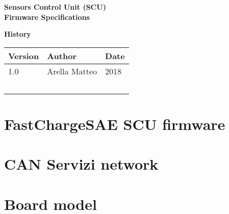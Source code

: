 \documentclass[twoside]{book}
\newcommand{\+}{\discretionary{\mbox{\scriptsize$\hookleftarrow$}}{}{}}
\newcommand{\clearemptydoublepage}{%
  \newpage{\pagestyle{empty}\cleardoublepage}%
}
\begin{document}
\hypersetup{pageanchor=false,
             bookmarksnumbered=true,
             pdfencoding=unicode
            }
\begin{titlepage}
\vspace*{7cm}
\begin{center}%
{\Large \textbf{Sensors Control Unit (SCU) }}\\
\vspace*{1cm}
{\large \textbf{Firmware Specifications}}\\
\end{center}
\end{titlepage}
\clearemptydoublepage
{}

\begin{center}
{\Large \textbf{History}}\\
\vspace*{1cm}
\begin{table}[htbp]
    \centering
    \begin{tabularx}{\textwidth}{| X | X | X |}
        \hline
		\textbf{Version} & \textbf{Author} & \textbf{Date} \\ \hline
		1.0              & Arella Matteo   & 2018          \\ \hline
		\ 				 & \ 			   & \ 			   \\ \hline
	\end{tabularx}
\end{table}
\end{center}

\tableofcontents
\clearemptydoublepage
{}
\hypersetup{pageanchor=true}

\chapter{Fast\+Charge\+S\+AE S\+CU firmware}
\label{index}\hypertarget{index}{}
\chapter{C\+AN Servizi network}
\label{_c_a_n_network_page}

\chapter{Board model}
\label{_model_page}

\end{document}
